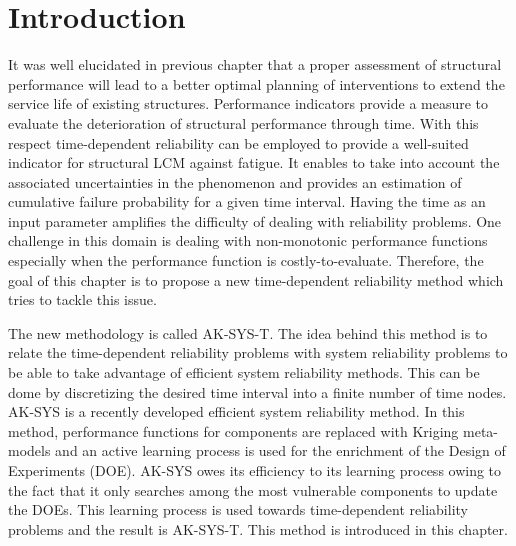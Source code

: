 \newpage


\section{Introduction}
\noindent
It was well elucidated in previous chapter that a proper assessment of structural performance will lead to a better optimal planning of interventions to extend the 
service life of existing structures. Performance indicators provide a measure to evaluate the deterioration of structural performance through time. With this 
respect time-dependent reliability can be employed to provide a well-suited indicator for structural LCM against fatigue. It enables to take into account the 
associated uncertainties in the phenomenon and provides an estimation of cumulative failure probability for a given time interval. Having the time as an input
parameter amplifies the difficulty of dealing with reliability problems. One challenge in this domain is dealing with non-monotonic performance functions especially 
when the performance function is costly-to-evaluate. Therefore, the goal of this chapter is to propose a new time-dependent reliability method which tries to tackle this 
issue. 

The new methodology is called AK-SYS-T. The idea behind this method is to relate the time-dependent reliability problems with system reliability problems to be able to 
take advantage of efficient system reliability methods. This can be dome by discretizing the desired time interval into a finite number of time nodes. AK-SYS is a recently 
developed efficient system reliability method. In this method, performance functions for components are replaced with Kriging meta-models and an active learning process is 
used for the enrichment of the Design of Experiments (DOE). AK-SYS owes its efficiency to its learning process owing to the fact that it only searches among the most vulnerable 
components to update the DOEs. This learning process is used towards time-dependent reliability problems and the result is AK-SYS-T. This method is introduced in this chapter. 

